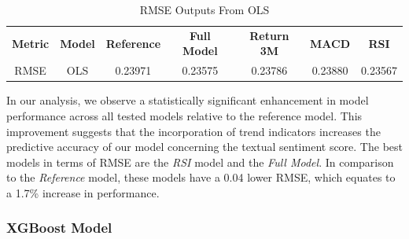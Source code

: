 \begin{table}[H]
\caption{RMSE Outputs From OLS} 
\label{tab:RMSEols}
\centering 
\small
\begin{tabular*}{\textwidth}{@{\extracolsep{\fill}}ccccccc@{}}
  \toprule
\textbf{Metric} & \textbf{Model} & \textbf{Reference} & \textbf{Full Model} & \textbf{Return 3M} & \textbf{MACD} & \textbf{RSI} \\ 
RMSE & OLS & 0.23971 & 0.23575 & 0.23786 & 0.23880 & 0.23567 \\ 
   \bottomrule
\end{tabular*}
\end{table}

In our analysis, we observe a statistically significant enhancement in model performance across all tested models relative to the reference model. This improvement suggests that the incorporation of trend indicators increases the predictive accuracy of our model concerning the textual sentiment score. The best models in terms of RMSE are the \textit{RSI} model and the \textit{Full Model}. %
In comparison to the \textit{Reference} model, these models have a 0.04 lower RMSE, which equates to a 1.7\% increase in performance. 


\subsubsection{XGBoost Model}

